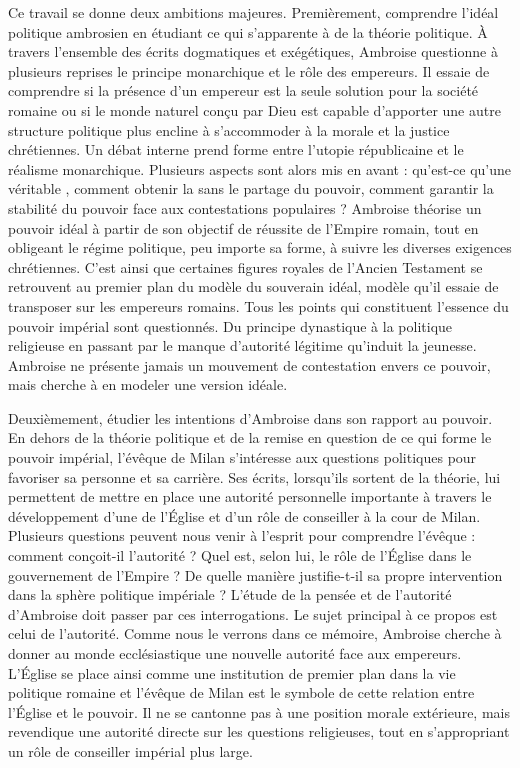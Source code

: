 \bigskip

Ce travail se donne deux ambitions majeures. Premièrement, comprendre l'idéal politique ambrosien en étudiant ce qui s'apparente à de la théorie politique. À travers l'ensemble des écrits dogmatiques et exégétiques, Ambroise questionne à plusieurs reprises le principe monarchique et le rôle des empereurs. Il essaie de comprendre si la présence d'un empereur est la seule solution pour la société romaine ou si le monde naturel conçu par Dieu est capable d'apporter une autre structure politique plus encline à s'accommoder à la morale et la justice chrétiennes. Un débat interne prend forme entre l'utopie républicaine et le réalisme monarchique. Plusieurs aspects sont alors mis en avant : qu'est-ce qu'une véritable , comment obtenir la  sans le partage du pouvoir, comment garantir la stabilité du pouvoir face aux contestations populaires ? Ambroise théorise un pouvoir idéal à partir de son objectif de réussite de l'Empire romain, tout en obligeant le régime politique, peu importe sa forme, à suivre les diverses exigences chrétiennes. C'est ainsi que certaines figures royales de l'Ancien Testament se retrouvent au premier plan du modèle du souverain idéal, modèle qu'il essaie de transposer sur les empereurs romains. Tous les points qui constituent l'essence du pouvoir impérial sont questionnés. Du principe dynastique à la politique religieuse en passant par le manque d'autorité légitime qu'induit la jeunesse. Ambroise ne présente jamais un mouvement de contestation envers ce pouvoir, mais cherche à en modeler une version idéale.

\bigskip

Deuxièmement, étudier les intentions d'Ambroise dans son rapport au pouvoir. En dehors de la théorie politique et de la remise en question de ce qui forme le pouvoir impérial, l'évêque de Milan s'intéresse aux questions politiques pour favoriser sa personne et sa carrière. Ses écrits, lorsqu'ils sortent de la théorie, lui permettent de mettre en place une autorité personnelle importante à travers le développement d'une  de l'Église et d'un rôle de conseiller à la cour de Milan. Plusieurs questions peuvent nous venir à l'esprit pour comprendre l'évêque : comment conçoit-il l’autorité ? Quel est, selon lui, le rôle de l’Église dans le gouvernement de l’Empire ? De quelle manière justifie-t-il sa propre intervention dans la sphère politique impériale ? L'étude de la pensée et de l'autorité d'Ambroise doit passer par ces interrogations. Le sujet principal à ce propos est celui de l'autorité. Comme nous le verrons dans ce mémoire, Ambroise cherche à donner au monde ecclésiastique une nouvelle autorité face aux empereurs. L'Église se place ainsi comme une institution de premier plan dans la vie politique romaine et l'évêque de Milan est le symbole de cette relation entre l'Église et le pouvoir. Il ne se cantonne pas à une position morale extérieure, mais revendique une autorité directe sur les questions religieuses, tout en s'appropriant un rôle de conseiller impérial plus large.

